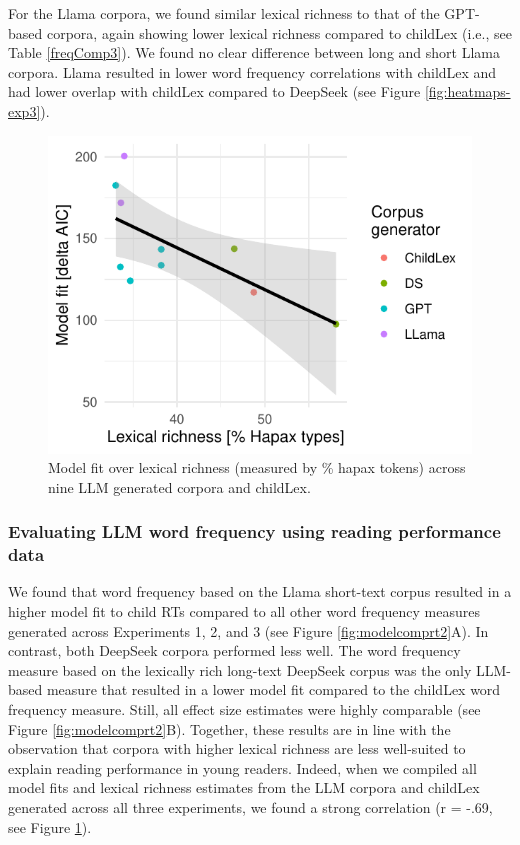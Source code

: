 \documentclass[doc, a4paper, anonymous]{apa7}
\begin{document}
For the Llama corpora, we found similar lexical richness to that of the GPT-based corpora, again showing lower lexical richness compared to childLex (i.e., see Table  \ref{freqComp3}). We found no clear difference between long and short Llama corpora. Llama resulted in lower word frequency correlations with childLex and had lower overlap with childLex compared to DeepSeek (see Figure \ref{fig:heatmaps-exp3}). 

\begin{figure}[!htbp]
  \centerline{
    \includegraphics[width=.6\textwidth]{figures/fig9_r2_cor.pdf}}
    \caption{Model fit over lexical richness (measured by \% hapax tokens) across nine LLM generated corpora and childLex. }
    \label{fig:scatterrichness}
\end{figure}


\subsubsection*{Evaluating LLM word frequency using reading performance data}

We found that word frequency based on the Llama short-text corpus resulted in a higher model fit to child RTs compared to all other word frequency measures generated across Experiments 1, 2, and 3 (see Figure \ref{fig:modelcomprt2}A). In contrast, both DeepSeek corpora performed less well. The word frequency measure based on the lexically rich long-text DeepSeek corpus was the only LLM-based measure that resulted in a lower model fit compared to the childLex word frequency measure. Still, all effect size estimates were highly comparable (see Figure \ref{fig:modelcomprt2}B). Together, these results are in line with the observation that corpora with higher lexical richness are less well-suited to explain reading performance in young readers. Indeed, when we compiled all model fits and lexical richness estimates from the LLM corpora and childLex generated across all three experiments, we found a strong correlation (r = -.69, see Figure \ref{fig:scatterrichness}). 
\end{document}

